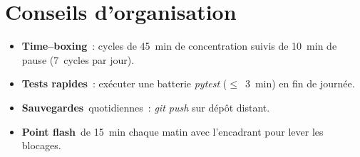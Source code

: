 \documentclass[11pt,a4paper]{article}
\begin{document}
\section*{Conseils d'organisation}
\begin{itemize}
  \item \textbf{Time--boxing} : cycles de 45 min de concentration suivis de 10 min de pause (7 cycles par jour).
  \item \textbf{Tests rapides} : exécuter une batterie \emph{pytest} (\(\leq\) 3 min) en fin de journée.
  \item \textbf{Sauvegardes} quotidiennes : \emph{git push} sur dépôt distant.
  \item \textbf{Point flash} de 15 min chaque matin avec l'encadrant pour lever les blocages.
\end{itemize}

\end{document}
